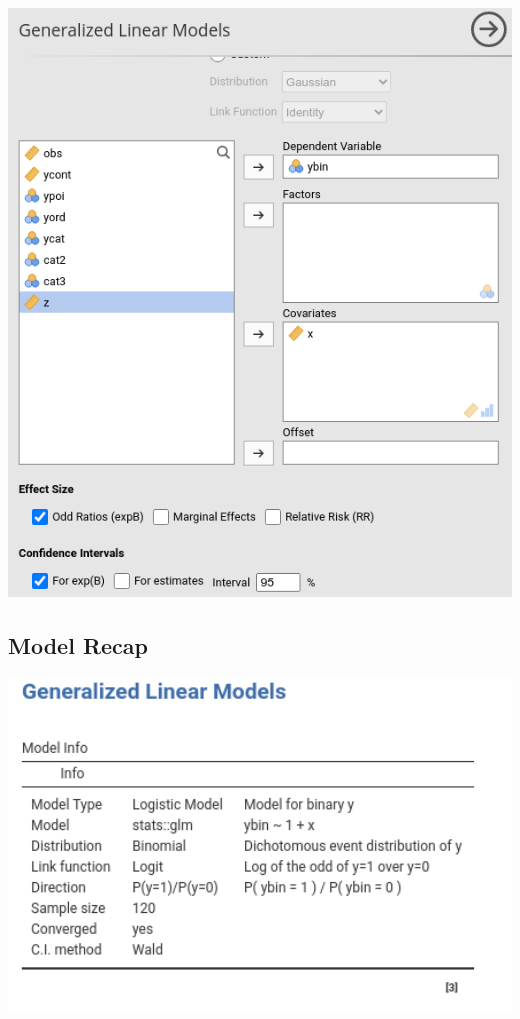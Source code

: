 \documentclass[
]{book}
\begin{document}
\includegraphics[width=7.88in]{bookletpics/3_logistic_input2}

\hypertarget{logisticrecap}{%
\subsection{Model Recap}\label{logisticrecap}}

\includegraphics[width=6.08in]{bookletpics/3_logistic_output1}
\end{document}
